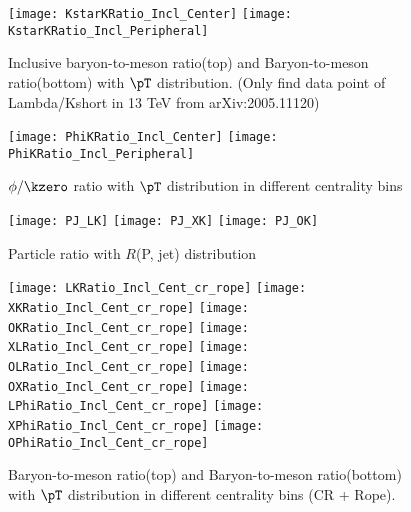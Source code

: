 \begin{figure}[ht]
	\begin{center}
		\texttt{[image: KstarKRatio\_Incl\_Center]}
		\texttt{[image: KstarKRatio\_Incl\_Peripheral]}
	\end{center}
  \caption{Inclusive baryon-to-meson ratio(top) and Baryon-to-meson ratio(bottom) with $\pT$ distribution. (Only find data point of Lambda/Kshort in 13 TeV from arXiv:2005.11120)}
  \label{fig:InclKstarKRatio}
\end{figure}

\begin{figure}[ht]
	\begin{center}
		\texttt{[image: PhiKRatio\_Incl\_Center]}
		\texttt{[image: PhiKRatio\_Incl\_Peripheral]}
	\end{center}
	\caption{$\phi/\kzero$ ratio with $\pT$ distribution in different centrality bins}
	\label{fig:InclPhiKRatio}
\end{figure}

\begin{figure}[ht]
	\begin{center}
		\texttt{[image: PJ\_LK]}
		\texttt{[image: PJ\_XK]}
		\texttt{[image: PJ\_OK]}
	\end{center}
	\caption{Particle ratio with $R$(P, jet) distribution}
	\label{fig:ParRatiotoJet}
\end{figure}


\begin{figure}[ht]
        \begin{center}
                \texttt{[image: LKRatio\_Incl\_Cent\_cr\_rope]}
                \texttt{[image: XKRatio\_Incl\_Cent\_cr\_rope]}
                \texttt{[image: OKRatio\_Incl\_Cent\_cr\_rope]}
                \texttt{[image: XLRatio\_Incl\_Cent\_cr\_rope]}
                \texttt{[image: OLRatio\_Incl\_Cent\_cr\_rope]}
                \texttt{[image: OXRatio\_Incl\_Cent\_cr\_rope]}
                \texttt{[image: LPhiRatio\_Incl\_Cent\_cr\_rope]}
                \texttt{[image: XPhiRatio\_Incl\_Cent\_cr\_rope]}
                \texttt{[image: OPhiRatio\_Incl\_Cent\_cr\_rope]}
        \end{center}
	\caption{Baryon-to-meson ratio(top) and Baryon-to-meson ratio(bottom) with $\pT$ distribution in different centrality bins (CR + Rope).}
        \label{fig:InclParRatioCentcrandrope}
\end{figure}

